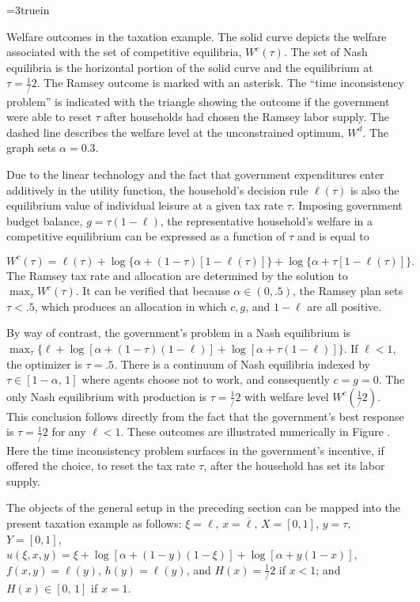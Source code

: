 \centerline{\epsfxsize=3truein}
\caption{Welfare outcomes in the taxation example.  The solid  curve depicts the welfare
associated with the set of competitive equilibria, $W^c(\tau)$.  The
set of Nash equilibria is the horizontal portion of the solid curve
and the equilibrium at $\tau=\frac1/2$.  The Ramsey outcome is
marked with an asterisk.  The ``time inconsistency problem'' is
indicated with the triangle showing the outcome if the government were
able to reset $\tau$ after households had chosen the Ramsey labor supply.
The dashed line describes the welfare level at the unconstrained optimum,
$W^d$. The graph sets $\alpha=0.3$.}
\endfigure


\medskip
\noindent
Due to the linear technology and the fact that government expenditures enter
additively in the utility function, the household's decision rule
$\ell(\tau)$ is also the equilibrium value of individual leisure
at a given tax rate $\tau$. Imposing government budget balance,
$g=\tau(1-\ell)$, the representative household's welfare in a
competitive equilibrium can be expressed as a function of  $\tau$ and is equal to

$$W^c(\tau) = \ell(\tau) + \log \bigl\{\alpha + (1-\tau)[1-\ell(\tau)]\bigr\}
            + \log \bigl\{\alpha + \tau [1-\ell(\tau)]\bigr\}.
$$
The Ramsey tax rate and allocation are determined by
 the solution to $\max_\tau W^c(\tau)$. It can be verified that because $\alpha \in (0, .5)$,
 the Ramsey plan sets $\tau < .5$, which produces an allocation in which $c, g$, and $1- \ell$ are all positive.

 By way of contrast, the government's problem in a Nash equilibrium is
$\max_\tau \bigl\{ \ell + \log [\alpha + (1-\tau) ( 1 - \ell)]
+ \log[\alpha + \tau(1 - \ell)]\bigr\}$.  If $\ell <1$, the optimizer
is $\tau = .5$.  There is a continuum of Nash equilibria indexed
by $\tau\in[1-\alpha,\,1]$ where agents choose not to work, and
consequently $c=g=0$. The only Nash equilibrium with production
is $\tau=\frac1/2$ with welfare level $W^c(\frac1/2)$. This
conclusion follows directly from the fact that the government's
best response is $\tau=\frac1/2$ for any $\ell<1$.
These outcomes are illustrated numerically in Figure . %
Here the time inconsistency problem surfaces in the government's
incentive,
if offered the choice,
 to reset  the tax rate $\tau$,
after the household has set its labor supply.


The objects of the general setup in the preceding section can be mapped
into the present taxation example
as follows:  $\xi=\ell$, $x=\overline \ell$, $X=[0,1]$, $y=\tau$, $Y=[0,1]$,
$u(\xi,x,y)=\xi+\log[\alpha + (1-y)(1-\xi)] + \log[\alpha + y(1-x)]$,
$f(x,y)=\ell(y)$, $h(y)=\ell(y)$, and $H(x)=\frac1/2$ if $x<1$; and
$H(x)\in[0,\,1]$ if $x=1$.


